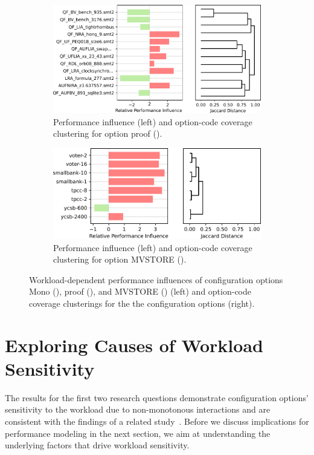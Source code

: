 {{{\begin{figure}
	\begin{subfigure}{\linewidth}
		\centering
		\vspace{2em}
		\includegraphics[width=0.96\linewidth]{images/proof.pdf}
		\caption{Performance influence (left) and option-code coverage clustering for option \textsf{proof} (\zdrei).}
		\label{fig:proof_z3}
	\end{subfigure}

	\begin{subfigure}{\linewidth}
		\centering
		\vspace{2em}
		\includegraphics[width=0.96\linewidth]{images/MVSTORE.pdf}
		\caption{Performance influence (left) and option-code coverage clustering for option \textsf{MVSTORE} (\htwo).}
		\label{fig:mvstore_h2}
	\end{subfigure}
\caption{Workload-dependent performance influences of configuration options \textsf{Mono} (\jumper), \textsf{proof} (\zdrei), and \textsf{MVSTORE} (\htwo) (left) and option-code coverage clusterings for the the configuration options (right).}
\end{figure}

\label{sec:rq3}\label{sec:categories}
\color{brown}
\section{Exploring Causes of Workload Sensitivity}\label{sec:new_section}
The results for the first two research questions demonstrate configuration options’ sensitivity to the workload due to non-monotonous interactions and are consistent with the findings of a related study~\cite{lesoil_2021}. Before we discuss implications for performance modeling in the next section, we aim at understanding the underlying factors that drive workload sensitivity.

}}}

